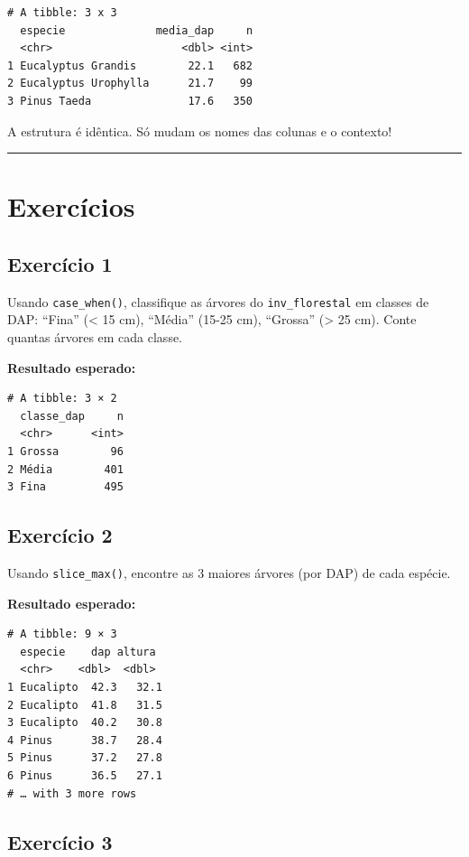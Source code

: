 \documentclass[
  letterpaper,
]{scrbook}
\begin{document}
\begin{verbatim}
# A tibble: 3 x 3
  especie              media_dap     n
  <chr>                    <dbl> <int>
1 Eucalyptus Grandis        22.1   682
2 Eucalyptus Urophylla      21.7    99
3 Pinus Taeda               17.6   350
\end{verbatim}

A estrutura é idêntica. Só mudam os nomes das colunas e o contexto!

\begin{center}\rule{0.5\linewidth}{0.5pt}\end{center}

\section{Exercícios}\label{exercuxedcios-10}

\subsection{Exercício 1}\label{exercuxedcio-1-9}

Usando \texttt{case\_when()}, classifique as árvores do
\texttt{inv\_florestal} em classes de DAP: ``Fina'' (\textless{} 15 cm),
``Média'' (15-25 cm), ``Grossa'' (\textgreater{} 25 cm). Conte quantas
árvores em cada classe.

\textbf{Resultado esperado:}

\begin{verbatim}
# A tibble: 3 × 2
  classe_dap     n
  <chr>      <int>
1 Grossa        96
2 Média        401
3 Fina         495
\end{verbatim}

\subsection{Exercício 2}\label{exercuxedcio-2-9}

Usando \texttt{slice\_max()}, encontre as 3 maiores árvores (por DAP) de
cada espécie.

\textbf{Resultado esperado:}

\begin{verbatim}
# A tibble: 9 × 3
  especie    dap altura
  <chr>    <dbl>  <dbl>
1 Eucalipto  42.3   32.1
2 Eucalipto  41.8   31.5
3 Eucalipto  40.2   30.8
4 Pinus      38.7   28.4
5 Pinus      37.2   27.8
6 Pinus      36.5   27.1
# … with 3 more rows
\end{verbatim}

\subsection{Exercício 3}\label{exercuxedcio-3-8}
\end{document}
